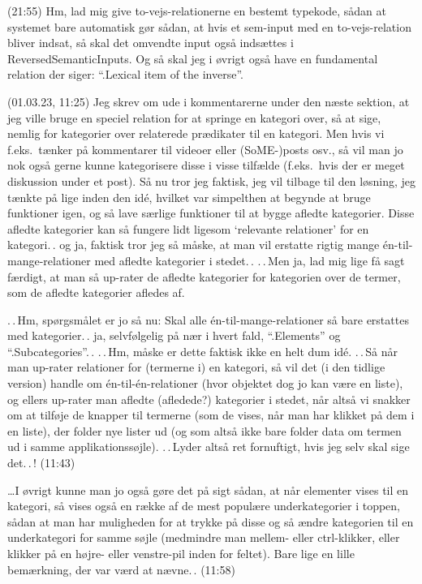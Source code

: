 \documentclass{report}
\begin{document}
(21:55) Hm, lad mig give to-vejs-relationerne en bestemt typekode, sådan at systemet bare automatisk gør sådan, at hvis et sem-input med en to-vejs-relation bliver indsat, så skal det omvendte input også indsættes i ReversedSemanticInputs. Og så skal jeg i øvrigt også have en fundamental relation der siger: ``.Lexical item of the inverse''. 


(01.03.23, 11:25) Jeg skrev om ude i kommentarerne under den næste sektion, at jeg ville bruge en speciel relation for at springe en kategori over, så at sige, nemlig for kategorier over relaterede prædikater til en kategori. Men hvis vi f.eks.\ tænker på kommentarer til videoer eller (SoME-)posts osv., så vil man jo nok også gerne kunne kategorisere disse i visse tilfælde (f.eks.\ hvis der er meget diskussion under et post). Så nu tror jeg faktisk, jeg vil tilbage til den løsning, jeg tænkte på lige inden den idé, hvilket var simpelthen at begynde at bruge funktioner igen, og så lave særlige funktioner til at bygge afledte kategorier. Disse afledte kategorier kan så fungere lidt ligesom `relevante relationer' for en kategori.\,. og ja, faktisk tror jeg så måske, at man vil erstatte rigtig mange én-til-mange-relationer med afledte kategorier i stedet.\,. .\,.\,Men ja, lad mig lige få sagt færdigt, at man så up-rater de afledte kategorier for kategorien over de termer, som de afledte kategorier afledes af. 

.\,.\,Hm, spørgsmålet er jo så nu: Skal alle én-til-mange-relationer så bare erstattes med kategorier.\,. ja, selvfølgelig på nær i hvert fald, ``.Elements'' og ``.Subcategories''.\,. .\,.\,Hm, måske er dette faktisk ikke en helt dum idé. .\,.\,Så når man up-rater relationer for (termerne i) en kategori, så vil det (i den tidlige version) handle om én-til-én-relationer (hvor objektet dog jo kan være en liste), og ellers up-rater man afledte (afledede?) kategorier i stedet, når altså vi snakker om at tilføje de knapper til termerne (som de vises, når man har klikket på dem i en liste), der folder nye lister ud (og som altså ikke bare folder data om termen ud i samme applikationssøjle). .\,.\,Lyder altså ret fornuftigt, hvis jeg selv skal sige det.\,.\,! (11:43)

\ldots I øvrigt kunne man jo også gøre det på sigt sådan, at når elementer vises til en kategori, så vises også en række af de mest populære underkategorier i toppen, sådan at man har muligheden for at trykke på disse og så ændre kategorien til en underkategori for samme søjle (medmindre man mellem- eller ctrl-klikker, eller klikker på en højre- eller venstre-pil inden for feltet). Bare lige en lille bemærkning, der var værd at nævne.\,. (11:58)
\end{document}
